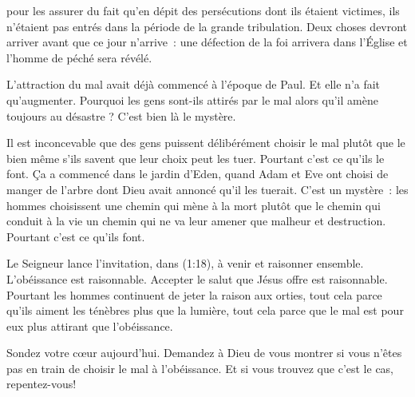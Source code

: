 



 pour les assurer du fait
 qu'en dépit des persécutions dont ils étaient victimes,
 ils n'étaient pas entrés dans la période de la grande tribulation.
 Deux choses devront arriver avant que ce jour n'arrive~:
 une défection de la foi arrivera dans l'Église 
 et l'homme de péché sera révélé.

L'attraction du mal avait déjà commencé à l'époque de Paul.
 Et elle n'a fait qu'augmenter. Pourquoi 
 les gens sont-ils attirés
 par le mal alors qu'il amène toujours au désastre ?
 C'est bien là le mystère.


Il est inconcevable que des gens puissent délibérément choisir le mal
 plutôt que le bien \ocadr même s'ils savent que leur choix peut les tuer.
 Pourtant c'est ce qu'ils le font.
 Ça a commencé dans le jardin d'Eden, quand Adam et Eve ont choisi de manger
 de l'arbre dont Dieu avait annoncé qu'il les tuerait.
 C'est un mystère~: les hommes choisissent une chemin qui mène à la mort
 plutôt que le chemin qui conduit à la vie
 \ocadr un chemin qui ne va leur amener que malheur et destruction.
 Pourtant c'est ce qu'ils font.

Le Seigneur lance l'invitation, dans (1:18),
 à \og venir et raisonner ensemble. \fg{} L'obéissance est raisonnable.
 Accepter le salut que Jésus offre est raisonnable.
 Pourtant les hommes continuent  de jeter la raison aux orties,
 tout cela parce qu'ils aiment les ténèbres plus que la lumière,
 tout cela parce que le mal est pour eux plus attirant que l'obéissance.

Sondez votre cœur aujourd'hui. Demandez à Dieu de vous montrer
 si vous n'êtes pas en train de choisir le mal à l'obéissance.
 Et si vous trouvez que c'est le cas, repentez-vous!

\dvrule



